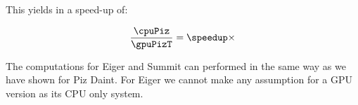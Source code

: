 \documentclass[]{article}
\begin{document}
This yields in a speed-up of:
\pgfmathsetmacro\speedup{\cpuPiz / \gpuPizT}
\begin{center}
	\begin{equation}
		\frac{\cpuPiz}{\gpuPizT} = \speedup \times
	\end{equation}
\end{center}

\vspace{5mm}

\pgfmathsetmacro{}
\pgfmathsetmacro{}
\pgfmathsetmacro{}
\pgfmathsetmacro{}
 
The computations for Eiger and Summit can performed in the same way as we have shown for Piz Daint. For Eiger we cannot make any assumption for a GPU version as its CPU only system.
\end{document}
